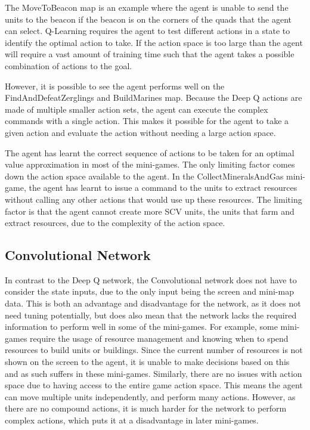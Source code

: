 The MoveToBeacon map is an example where the agent is unable to send the units
to the beacon if the beacon is on the corners of the quads that the agent can
select. Q-Learning requires the agent to test different actions in a state to
identify the optimal action to take. If the action space is too large than the
agent will require a vast amount of training time such that the agent takes a
possible combination of actions to the goal.

However, it is possible to see the agent performs well on the
FindAndDefeatZerglings and BuildMarines map. Because the Deep Q actions are made
of multiple smaller action sets, the agent can execute the complex
commands with a single action. This makes it possible for the agent to take a
given action and evaluate the action without needing a large action space.

The agent has learnt the correct sequence of actions to be taken for an optimal
value approximation in most of the mini-games. The only limiting factor comes
down the action space available to the agent. In the CollectMineralsAndGas
mini-game, the agent has learnt to issue a command to the units to extract
resources without calling any other actions that would use up these resources.
The limiting factor is that the agent cannot create more SCV units, the units
that farm and extract resources, due to the complexity of the action space.

\subsection{Convolutional Network}

In contrast to the Deep Q network, the Convolutional network does not have to
consider the state inputs, due to the only input being the screen and mini-map
data. This is both an advantage and disadvantage for the network, as it does not
need tuning potentially, but does also mean that the network lacks the required
information to perform well in some of the mini-games. For example, some
mini-games require the usage of resource management and knowing when to spend
resources to build units or buildings. Since the current number of resources is
not shown on the screen to the agent, it is unable to make decisions based on
this and as such suffers in these mini-games.
Similarly, there are no issues with action space due to having access to the
entire game action space. This means the agent can move multiple units
independently, and perform many actions. However, as there are no compound
actions, it is much harder for the network to perform complex actions, which
puts it at a disadvantage in later mini-games.

